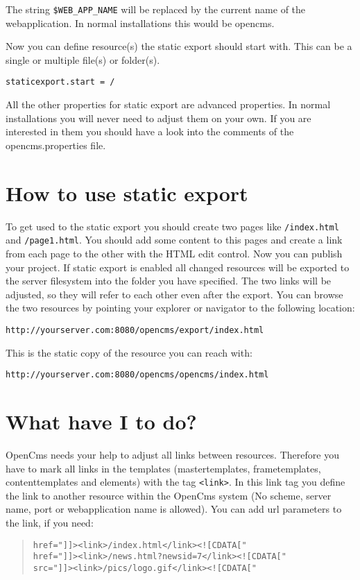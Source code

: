 The string \texttt{\${WEB\_APP\_NAME}} will be replaced by the current name of the webapplication. In normal installations this would be opencms.

Now you can define resource(s) the static export should start with. This can be a single or multiple file(s) or folder(s).

\texttt{staticexport.start = /}

All the other properties for static export are advanced properties. In normal installations you will never need to adjust them on your own. If you are interested in them you should have a look into the comments of the opencms.properties file.

\section{How to use static export}

To get used to the static export you should create two pages like \texttt{/index.html} and \texttt{/page1.html}. You should add some content to this pages and create a link from each page to the other with the HTML edit control. Now you can publish your project. If static export is enabled all changed resources will be exported to the server filesystem into the folder you have specified. The two links will be adjusted, so they will refer to each other even after the export. You can browse the two resources by pointing your explorer or navigator to the following location:

\texttt{http://yourserver.com:8080/opencms/export/index.html}

This is the static copy of the resource you can reach with:

\texttt{http://yourserver.com:8080/opencms/opencms/index.html}

\section{What have I to do?}

OpenCms needs your help to adjust all links between resources. Therefore you have to mark all links in the templates (mastertemplates, frametemplates, contenttemplates and elements) with the tag \texttt{<link>}. In this link tag you define the link to another resource within the OpenCms system (No scheme, server name, port or webapplication name is allowed). You can add url parameters to the link, if you need:

\begin{quote}
\begin{verbatim}
href="]]><link>/index.html</link><![CDATA["
href="]]><link>/news.html?newsid=7</link><![CDATA["
src="]]><link>/pics/logo.gif</link><![CDATA["
\end{verbatim}
\end{quote}

